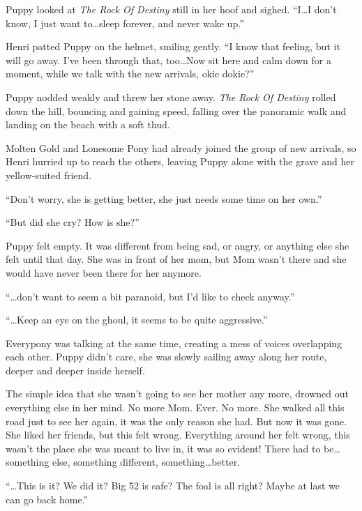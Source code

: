 Puppy looked at \emph{The Rock Of Destiny} still in her hoof and sighed. ``I\dots I don't know, I just want to\dots sleep forever, and never wake up.''

Henri patted Puppy on the helmet, smiling gently. ``I know that feeling, but it will go away. I've been through that, too\dots Now sit here and calm down for a moment, while we talk with the new arrivals, okie dokie?''

Puppy nodded weakly and threw her stone away. \emph{The Rock Of Destiny} rolled down the hill, bouncing and gaining speed, falling over the panoramic walk and landing on the beach with a soft thud.



\horizonline



Molten Gold and Lonesome Pony had already joined the group of new arrivals, so Henri hurried up to reach the others, leaving Puppy alone with the grave and her yellow-suited friend.

``Don't worry, she is getting better, she just needs some time on her own.''

``But did she cry? How is she?''

Puppy felt empty. It was different from being sad, or angry, or anything else she felt until that day. She was in front of her mom, but Mom wasn't there and she would have never been there for her anymore.

``\dots don't want to seem a bit paranoid, but I'd like to check anyway.''

``\dots Keep an eye on the ghoul, it seems to be quite aggressive.''

Everypony was talking at the same time, creating a mess of voices overlapping each other. Puppy didn't care, she was slowly sailing away along her route, deeper and deeper inside herself.

The simple idea that she wasn't going to see her mother any more, drowned out everything else in her mind. No more Mom. Ever. No more. She walked all this road just to see her again, it was the only reason she had. But now it was gone. She liked her friends, but this felt wrong. Everything around her felt wrong, this wasn't the place she was meant to live in, it was so evident! There had to be\dots something else, something different, something\dots better.

``\dots This is it? We did it? Big 52 is safe? The foal is all right? Maybe at last we can go back home.''

